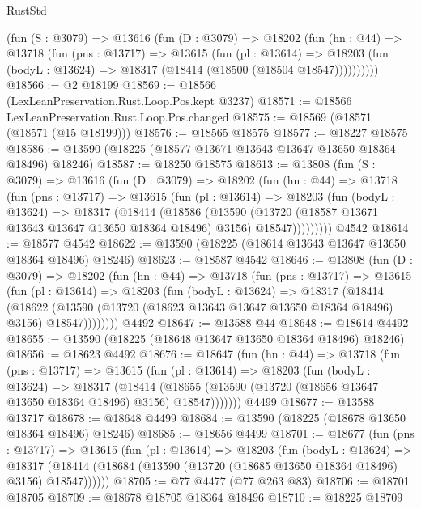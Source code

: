 \begin{lexlean}{RustStd}
\begin{coremodule}
      (fun (S : @3079) =>
      @13616
        (fun (D : @3079) =>
        @18202
          (fun (hn : @44) =>
          @13718
            (fun (pns : @13717) =>
            @13615
              (fun (pl : @13614) =>
              @18203 (fun (bodyL : @13624) => @18317 (@18414 (@18500 (@18504 @18547))))))))))
@18566 := @2 @18199
@18569 := @18566 (LexLeanPreservation.Rust.Loop.Pos.kept @3237)
@18571 := @18566 LexLeanPreservation.Rust.Loop.Pos.changed
@18575 := @18569 (@18571 (@18571 (@15 @18199)))
@18576 := @18565 @18575
@18577 := @18227 @18575
@18586 := @13590 (@18225 (@18577 @13671 @13643 @13647 @13650 @18364 @18496) @18246)
@18587 := @18250 @18575
@18613 := @13808
    (fun (S : @3079) =>
    @13616
      (fun (D : @3079) =>
      @18202
        (fun (hn : @44) =>
        @13718
          (fun (pns : @13717) =>
          @13615
            (fun (pl : @13614) =>
            @18203
              (fun (bodyL : @13624) =>
              @18317
                (@18414
                  (@18586
                    (@13590
                      (@13720 (@18587 @13671 @13643 @13647 @13650 @18364 @18496) @3156)
                      @18547)))))))))
    @4542
@18614 := @18577 @4542
@18622 := @13590 (@18225 (@18614 @13643 @13647 @13650 @18364 @18496) @18246)
@18623 := @18587 @4542
@18646 := @13808
    (fun (D : @3079) =>
    @18202
      (fun (hn : @44) =>
      @13718
        (fun (pns : @13717) =>
        @13615
          (fun (pl : @13614) =>
          @18203
            (fun (bodyL : @13624) =>
            @18317
              (@18414
                (@18622
                  (@13590 (@13720 (@18623 @13643 @13647 @13650 @18364 @18496) @3156) @18547))))))))
    @4492
@18647 := @13588 @44
@18648 := @18614 @4492
@18655 := @13590 (@18225 (@18648 @13647 @13650 @18364 @18496) @18246)
@18656 := @18623 @4492
@18676 := @18647
    (fun (hn : @44) =>
    @13718
      (fun (pns : @13717) =>
      @13615
        (fun (pl : @13614) =>
        @18203
          (fun (bodyL : @13624) =>
          @18317
            (@18414
              (@18655 (@13590 (@13720 (@18656 @13647 @13650 @18364 @18496) @3156) @18547)))))))
    @4499
@18677 := @13588 @13717
@18678 := @18648 @4499
@18684 := @13590 (@18225 (@18678 @13650 @18364 @18496) @18246)
@18685 := @18656 @4499
@18701 := @18677
    (fun (pns : @13717) =>
    @13615
      (fun (pl : @13614) =>
      @18203
        (fun (bodyL : @13624) =>
        @18317 (@18414 (@18684 (@13590 (@13720 (@18685 @13650 @18364 @18496) @3156) @18547))))))
@18705 := @77 @4477 (@77 @263 @83)
@18706 := @18701 @18705
@18709 := @18678 @18705 @18364 @18496
@18710 := @18225 @18709

\end{coremodule}
\end{lexlean}
